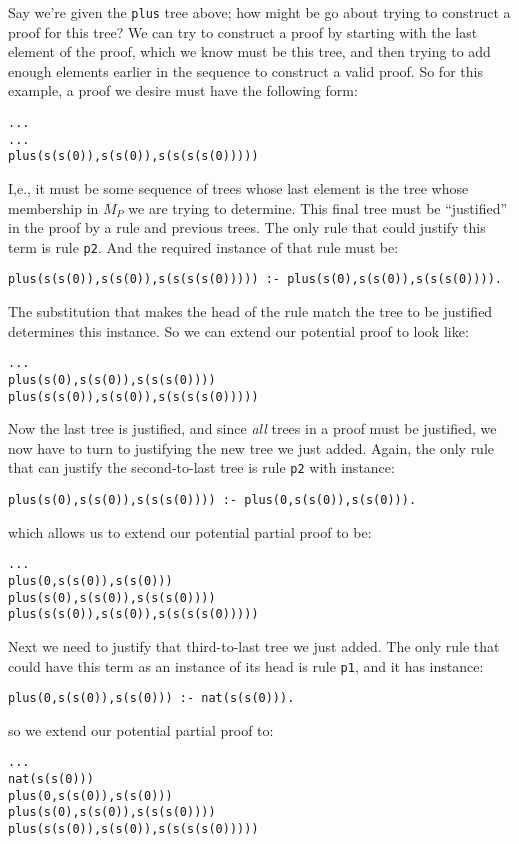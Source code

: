 Say we're given the \verb|plus| tree above; how might be go about
trying to construct a proof for this tree?  We can try to construct a
proof by starting with the last element of the proof, which we know
must be this tree, and then trying to add enough elements earlier in
the sequence to construct a valid proof.  So for this example, a proof
we desire must have the following form:
\begin{verbatim}
...
...
plus(s(s(0)),s(s(0)),s(s(s(s(0)))))
\end{verbatim}
I,e., it must be some sequence of trees whose last element is the tree
whose membership in $M_P$ we are trying to determine.  This final tree
must be ``justified'' in the proof by a rule and previous trees.  The
only rule that could justify this term is rule {\tt p2}.  And the
required instance of that rule must be:
\begin{verbatim}
plus(s(s(0)),s(s(0)),s(s(s(s(0))))) :- plus(s(0),s(s(0)),s(s(s(0)))).
\end{verbatim}
The substitution that makes the head of the rule match the tree to be
justified determines this instance.  So we can extend our potential
proof to look like:
\begin{verbatim}
...
plus(s(0),s(s(0)),s(s(s(0))))
plus(s(s(0)),s(s(0)),s(s(s(s(0)))))
\end{verbatim}
Now the last tree is justified, and since {\em all} trees in a proof
must be justified, we now have to turn to justifying the new tree we
just added.  Again, the only rule that can justify the second-to-last
tree is rule {\tt p2} with instance:
\begin{verbatim}
plus(s(0),s(s(0)),s(s(s(0)))) :- plus(0,s(s(0)),s(s(0))).
\end{verbatim}
which allows us to extend our potential partial proof to be:
\begin{verbatim}
...
plus(0,s(s(0)),s(s(0)))
plus(s(0),s(s(0)),s(s(s(0))))
plus(s(s(0)),s(s(0)),s(s(s(s(0)))))
\end{verbatim}
Next we need to justify that third-to-last tree we just added.  The
only rule that could have this term as an instance of its head is rule
{\tt p1}, and it has instance:
\begin{verbatim}
plus(0,s(s(0)),s(s(0))) :- nat(s(s(0))).
\end{verbatim}
so we extend our potential partial proof to:
\begin{verbatim}
...
nat(s(s(0)))
plus(0,s(s(0)),s(s(0)))
plus(s(0),s(s(0)),s(s(s(0))))
plus(s(s(0)),s(s(0)),s(s(s(s(0)))))
\end{verbatim}

